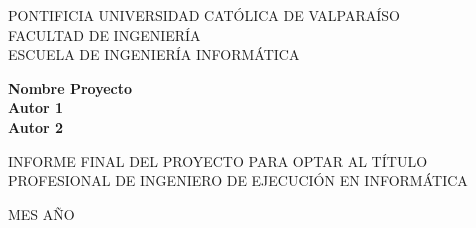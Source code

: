 
\begin{center}
\large{PONTIFICIA UNIVERSIDAD CATÓLICA DE VALPARAÍSO\\FACULTAD DE INGENIERÍA\\ESCUELA DE INGENIERÍA INFORMÁTICA}

\vskip 1in

\Large{\textbf{Nombre Proyecto}}
\vskip 0.4in
\Large{\textbf{\\Autor 1\\}}
\vskip 0.2in
\Large{\textbf{Autor 2\\}}

\hfill

\vskip 1.5in
\begin{flushright}
	\parbox[t]{3.3in}{
		\large{
			INFORME FINAL DEL PROYECTO
			PARA OPTAR AL TÍTULO PROFESIONAL DE
			INGENIERO DE EJECUCIÓN EN INFORMÁTICA
		}
	}
\end{flushright}
\vskip 2in
\large{MES AÑO} 
\end{center}

\pagestyle{empty}

